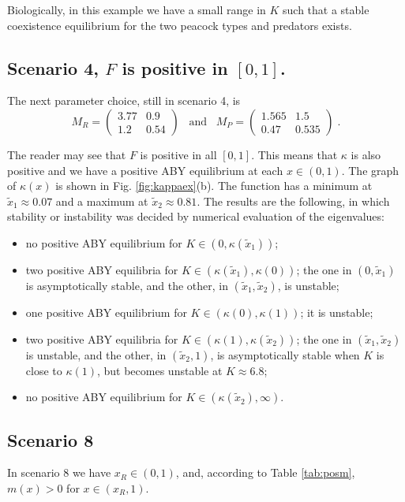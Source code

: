\documentclass[12pt]{article}
\theoremstyle{definition}
\begin{document}
Biologically, in this example we have a small range in $K$ such that a stable coexistence equilibrium for the two peacock types and predators exists.


\subsection{Scenario 4, $F$ is positive in $[0,1]$.}\label{sub:ex3}
The next parameter choice, still in scenario 4, is
\begin{equation}
	M_R= \begin{pmatrix}
		3.77&0.9\\
		1.2&0.54
	\end{pmatrix} \;\;\;\mathrm{and}\;\;\;M_P= \begin{pmatrix}
		1.565&1.5\\
		0.47&0.535
	\end{pmatrix} \;.
\end{equation}

The reader may see that $F$ is positive in all $[0,1]$. This means that $\kappa$ is also positive and we have a positive ABY equilibrium at each $x \in (0,1)$. The graph of $\kappa(x)$ is shown in Fig. \ref{fig:kappaex}(b). The function has a minimum at $\tilde{x}_1 \approx 0.07$ and a maximum at $\tilde{x}_2 \approx 0.81$. The results are the following, in which stability or instability was decided by numerical evaluation of the eigenvalues:
\begin{itemize}
	\item no positive ABY equilibrium for $K \in (0,\kappa(\tilde{x}_1))$;
	\item two positive ABY equilibria for $K \in (\kappa(\tilde{x}_1), \kappa(0))$; the one in $(0,\tilde{x}_1)$ is asymptotically stable, and the other, in $(\tilde{x}_1, \tilde{x}_2)$, is unstable;
	\item one positive ABY equilibrium for $K  \in (\kappa(0), \kappa(1))$; it is unstable;
	\item two positive ABY equilibria for $K \in (\kappa(1), \kappa(\tilde{x}_2))$; the one in $(\tilde{x}_1, \tilde{x}_2)$ is unstable, and the other, in $(\tilde{x}_2,1)$, is asymptotically stable when $K$ is close to $\kappa(1)$, but becomes unstable at $K \approx 6.8$;
	\item no positive ABY equilibrium for $K \in (\kappa(\tilde{x}_2), \infty)$.
\end{itemize}

\subsection{Scenario 8} \label{sub:ex4}
In scenario 8 we have $x_R \in(0,1)$, and, according to Table \ref{tab:posm}, $m(x)>0$ for $x \in (x_R,1)$. 
\end{document}
